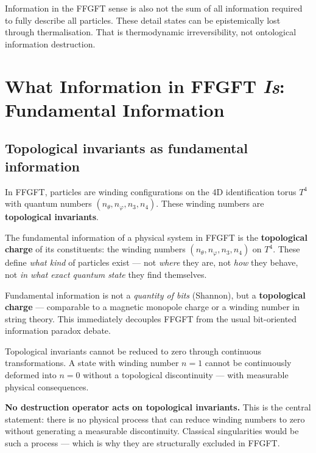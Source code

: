Information in the FFGFT sense is also not the sum of all information required to fully describe all particles. These detail states can be epistemically lost through thermalisation. That is thermodynamic irreversibility, not ontological information destruction.

\section{What Information in FFGFT \emph{Is}: Fundamental Information}

\subsection{Topological invariants as fundamental information}

In FFGFT, particles are winding configurations on the 4D identification torus $T^4$ with quantum numbers $(n_\theta, n_\varphi, n_3, n_4)$. These winding numbers are \textbf{topological invariants}.

\begin{keyresult}
The fundamental information of a physical system in FFGFT is the \textbf{topological charge} of its constituents: the winding numbers $(n_\theta, n_\varphi, n_3, n_4)$ on $T^4$. These define \emph{what kind} of particles exist --- not \emph{where} they are, not \emph{how} they behave, not \emph{in what exact quantum state} they find themselves.

Fundamental information is not a \emph{quantity of bits} (Shannon), but a \textbf{topological charge} --- comparable to a magnetic monopole charge or a winding number in string theory. This immediately decouples FFGFT from the usual bit-oriented information paradox debate.
\end{keyresult}

Topological invariants cannot be reduced to zero through continuous transformations. A state with winding number $n = 1$ cannot be continuously deformed into $n = 0$ without a topological discontinuity --- with measurable physical consequences.

\begin{erkenntnis}
\textbf{No destruction operator acts on topological invariants.} This is the central statement: there is no physical process that can reduce winding numbers to zero without generating a measurable discontinuity. Classical singularities would be such a process --- which is why they are structurally excluded in FFGFT.
\end{erkenntnis}

